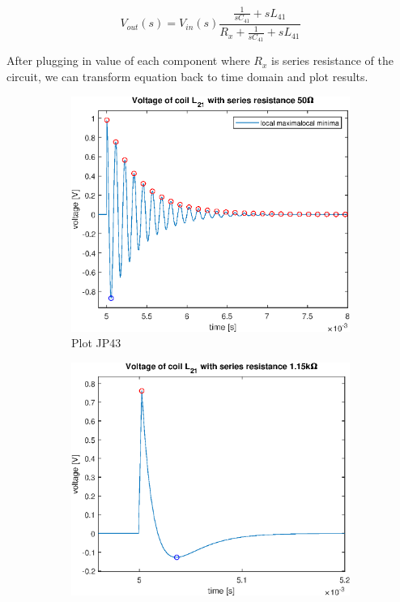 \documentclass[notitlepage, a4paper, 11pt]{article}
\begin{document}
	\begin{equation}
		V_{out}(s) = V_{in}(s) \dfrac{\frac{1}{sC_{41}}+sL_{41}}{R_x + \frac{1}{sC_{41}}+sL_{41}}
	\end{equation}
	
	After plugging in value of each component where $R_x$ is series resistance of the circuit, we can transform equation back to time domain and plot results.
	
	\begin{figure}[H]
		\centering
		\begin{subfigure}{0.3 \textwidth}
			\includegraphics[width=\textwidth]{../Matlab/img/CircuitC3}
			\caption{Plot JP43}
		\end{subfigure}
		\hfill
		\begin{subfigure}{0.3 \textwidth}
			\includegraphics[width=\textwidth]{../Matlab/img/CircuitC2}

\end{subfigure}
\end{figure}
\end{document}
